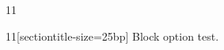 \documentclass[paper=A4]{ropas-poster}
\begin{document}
\begin{postergrid}{1}{1}
\begin{posterblock}{1}{1}[sectiontitle-size=25bp]
Block option test.
\end{posterblock}
\end{postergrid}
\end{document}
